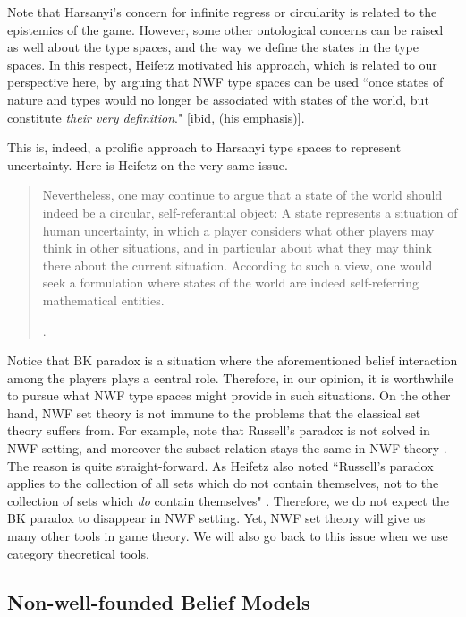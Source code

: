 \documentclass{article}
\begin{document}
Note that Harsanyi's concern for infinite regress or circularity is related to the epistemics of the game. However, some other ontological concerns can be raised as well about the type spaces, and the way we define the states in the type spaces. In this respect, Heifetz motivated his approach, which is related to our perspective here, by arguing that NWF type spaces can be used ``once states of nature and types would no longer be associated with states of the world, but constitute \emph{their very definition}." [ibid, (his emphasis)]. 

This is, indeed, a prolific approach to Harsanyi type spaces to represent uncertainty. Here is Heifetz on the very same issue.
\begin{quote}
Nevertheless, one may continue to argue that a state of the world should indeed be a circular, self-referantial object: A state represents a situation of human uncertainty, in which a player considers what other players may think in other situations, and in particular about what they may think there about the current situation. According to such a view, one would seek a formulation where states of the world are indeed self-referring mathematical entities.

\cite[p. 204]{heif}.
\end{quote}

Notice that BK paradox is a situation where the aforementioned belief interaction among the players plays a central role. Therefore, in our opinion, it is worthwhile to pursue what NWF type spaces might provide in such situations. On the other hand, NWF set theory is not immune to the problems that the classical set theory suffers from. For example, note that Russell's paradox is not solved in NWF setting, and moreover the subset relation stays the same in NWF theory \cite{moss0}. The reason is quite straight-forward. As Heifetz also noted ``Russell's paradox applies to the collection of all sets which do not contain themselves, not to the collection of sets which \emph{do} contain themselves" \cite[(his emphasis)]{heif}. Therefore, we do not expect the BK paradox to disappear in NWF setting. Yet, NWF set theory will give us many other tools in game theory. We will also go back to this issue when we use category theoretical tools.

\subsection{Non-well-founded Belief Models}
\end{document}
